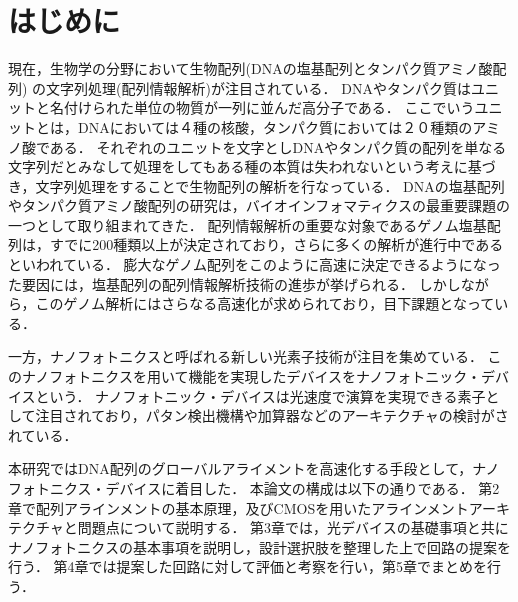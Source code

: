 \chapter{はじめに}
現在，生物学の分野において生物配列(DNAの塩基配列とタンパク質アミノ酸配列) の文字列処理(配列情報解析)が注目されている．
DNAやタンパク質はユニットと名付けられた単位の物質が一列に並んだ高分子である．
ここでいうユニットとは，DNAにおいては４種の核酸，タンパク質においては２０種類のアミノ酸である．
それぞれのユニットを文字としDNAやタンパク質の配列を単なる文字列だとみなして処理をしてもある種の本質は失われないという考えに基づき，文字列処理をすることで生物配列の解析を行なっている．
DNAの塩基配列やタンパク質アミノ酸配列の研究は，バイオインフォマティクスの最重要課題の一つとして取り組まれてきた．
配列情報解析の重要な対象であるゲノム塩基配列は，すでに200種類以上が決定されており，さらに多くの解析が進行中であるといわれている．
膨大なゲノム配列をこのように高速に決定できるようになった要因には，塩基配列の配列情報解析技術の進歩が挙げられる．
しかしながら，このゲノム解析にはさらなる高速化が求められており，目下課題となっている．

一方，ナノフォトニクスと呼ばれる新しい光素子技術が注目を集めている．
このナノフォトニクスを用いて機能を実現したデバイスをナノフォトニック・デバイスという．
ナノフォトニック・デバイスは光速度で演算を実現できる素子として注目されており，パタン検出機構や加算器などのアーキテクチャの検討がされている．

本研究ではDNA配列のグローバルアライメントを高速化する手段として，ナノフォトニクス・デバイスに着目した．
本論文の構成は以下の通りである．
第2章で配列アラインメントの基本原理，及びCMOSを用いたアラインメントアーキテクチャと問題点について説明する．
第3章では，光デバイスの基礎事項と共にナノフォトニクスの基本事項を説明し，設計選択肢を整理した上で回路の提案を行う．
第4章では提案した回路に対して評価と考察を行い，第5章でまとめを行う．

\cite{光コンピューテイング}
